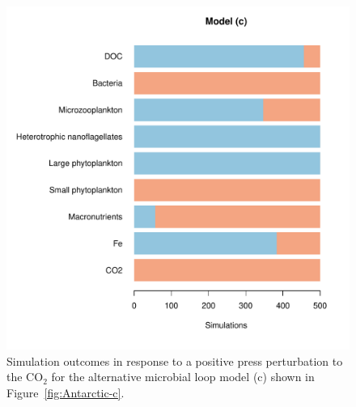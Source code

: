 \documentclass[a4paper]{article}\usepackage[]{graphicx}\usepackage[]{color}
\makeatletter
\def\maxwidth{ %
  \ifdim\Gin@nat@width>\linewidth
    \linewidth
  \else
    \Gin@nat@width
  \fi
}
\newenvironment{knitrout}{}{} %
\makeatother
\begin{document}
\begin{figure}[ht]
  \centering
\begin{knitrout}
\color{fgcolor}
\includegraphics[width=\maxwidth]{figure/unnamed-chunk-11-1} 

\end{knitrout}
\caption{Simulation outcomes in response to a positive press perturbation to the
  $\mathrm{CO}_{2}$ for the alternative microbial loop model (c) shown in
  Figure~\ref{fig:Antarctic-c}.}
  \label{fig:Perturb4}
\end{figure}
\clearpage



\end{document}

